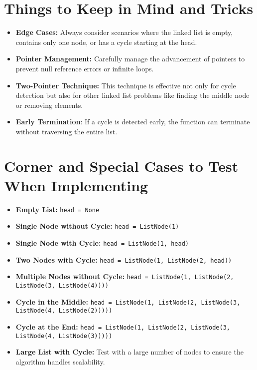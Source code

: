 \section*{Things to Keep in Mind and Tricks}
\begin{itemize}
    \item \textbf{Edge Cases:} Always consider scenarios where the linked list is empty, contains only one node, or has a cycle starting at the head.
    \item \textbf{Pointer Management:} Carefully manage the advancement of pointers to prevent null reference errors or infinite loops.
    \item \textbf{Two-Pointer Technique:} This technique is effective not only for cycle detection but also for other linked list problems like finding the middle node or removing elements.
    \item \textbf{Early Termination}: If a cycle is detected early, the function can terminate without traversing the entire list.
\end{itemize}

\section*{Corner and Special Cases to Test When Implementing}
\begin{itemize}
    \item \textbf{Empty List:} \texttt{head = None}
    \item \textbf{Single Node without Cycle:} \texttt{head = ListNode(1)}
    \item \textbf{Single Node with Cycle:} \texttt{head = ListNode(1, head)}
    \item \textbf{Two Nodes with Cycle:} \texttt{head = ListNode(1, ListNode(2, head))}
    \item \textbf{Multiple Nodes without Cycle:} \texttt{head = ListNode(1, ListNode(2, ListNode(3, ListNode(4))))}
    \item \textbf{Cycle in the Middle:} \texttt{head = ListNode(1, ListNode(2, ListNode(3, ListNode(4, ListNode(2)))))}
    \item \textbf{Cycle at the End:} \texttt{head = ListNode(1, ListNode(2, ListNode(3, ListNode(4, ListNode(3)))))}
    \item \textbf{Large List with Cycle:} Test with a large number of nodes to ensure the algorithm handles scalability.
\end{itemize}

\printindex